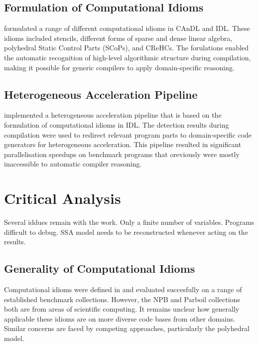 \subsection*{Formulation of Computational Idioms}

     formulated a range of
    different computational idioms in CAnDL and IDL.
    These idioms included stencils, different forms of sparse and dense linear
    algebra, polyhedral Static Control Parts (SCoPs), and CReHCs.
    The forulations enabled the automatic recognition of high-level algorithmic
    structure during compilation, making it possible for generic compilers to
    apply domain-specific reasoning.

\subsection*{Heterogeneous Acceleration Pipeline}

     implemented a heterogeneous acceleration pipeline that
    is based on the formulation of computational idioms in IDL.
    The detection results during compilation were used to redirect relevant
    program parts to domain-specific code generators for heterogeneous
    acceleration.
    This pipeline resulted in significant parallelisation speedups on benchmark
    programs that oreviously were mostly inaccessible to automatic compiler
    reasoning.

\section{Critical Analysis}

    Several iddues remain with the work.
    Only a finite number of variables.
    Programs difficult to debug.
    SSA model needs to be reconstructed whenever acting on the results.

\subsection*{Generality of Computational Idioms}  

    Computational idioms were defined in
     and
    evaluated succesfully on a range of established benchmark collections.
    However, the NPB and Parboil collections both are from areas of scientific
    computing.
    It remains unclear how generally applicable these idioms are on more
    diverse code bases from other domains.
    Similar concerns are faced by competing approaches, particularly the
    polyhedral model.

